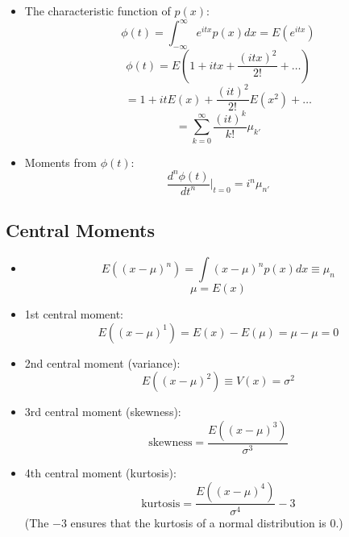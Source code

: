 \begin{itemize}
    \item The characteristic function of $p(x)$:
          \[ \phi(t) = \int_{-\infty}^{\infty} e^{itx} p(x) dx = E(e^{itx}) \]
          \[ \phi(t) = E \left( 1 + itx + \frac{(itx)^2}{2!} + \dots \right) \]
          \[ = 1 + it E(x) + \frac{(it)^2}{2!} E(x^2) + \dots \]
          \[ = \sum_{k=0}^{\infty} \frac{(it)^k}{k!} \mu_{k'} \]

    \item Moments from $\phi(t)$:
          \[ \frac{d^n \phi(t)}{dt^n} \Big|_{t=0} = i^n \mu_{n'} \]
\end{itemize}

\subsection{Central Moments}

\begin{itemize}
    \item
          \[ E((x-\mu)^n) = \int (x-\mu)^n p(x) dx \equiv \mu_n \]
          \[ \mu = E(x) \]

    \item 1st central moment:
          \[ E((x-\mu)^1) = E(x) - E(\mu) = \mu - \mu = 0 \]

    \item 2nd central moment (variance):
          \[ E((x-\mu)^2) \equiv V(x) = \sigma^2 \]

    \item 3rd central moment (skewness):
          \[ \text{skewness} = \frac{E((x-\mu)^3)}{\sigma^3} \]

    \item 4th central moment (kurtosis):
          \[ \text{kurtosis} = \frac{E((x-\mu)^4)}{\sigma^4} - 3 \]
          (The $-3$ ensures that the kurtosis of a normal distribution is 0.)
\end{itemize}
